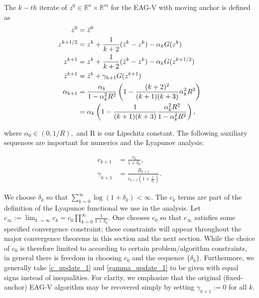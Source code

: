 \documentclass[11pt,reqno,oneside]{amsart}
\theoremstyle{definition}
\numberwithin{equation}{section}
\begin{document}
The $k-th$ iterate of $z^{0} \in \mathbb{R}^{n} \times \mathbb{R}^{m}$ for the EAG-V with moving anchor is defined as 
\begin{align}
    \notag z^{0}       &= \bar{z}^{0}\\
    \label{eagv update1} z^{k+1/2}   &= z^{k} + \frac{1}{k+2}(\bar{z}^{k} - z^{k}) - \alpha_{k}G(z^{k})\\
    \label{eagv update2} z^{k+1}     &= z^{k} + \frac{1}{k+2}(\bar{z}^{k} - z^{k}) - \alpha_{k}G(z^{k + 1/2})\\
    \label{eagv update3} \bar{z}^{k+1}&= \bar{z}^{k} + \gamma_{k+1}G(z^{k+1})\\
    \notag \alpha_{k+1}&= \frac{\alpha_{k}}{1 - \alpha_{k}^{2}R^{2}}\left(1 - \frac{(k+2)^{2}}{(k+1)(k+3)}\alpha_{k}^{2}R^{2}\right)\\
    &= \alpha_{k}\left(1 - \frac{1}{(k+1)(k+3)}\frac{\alpha_{k}^{2}R^{2}}{1 - \alpha_{k}^{2}R^{2}}\right), \label{normal_alpha}
\end{align}

where $\alpha_{0} \in (0,1/R),$ and R is our Lipschitz constant. The following auxiliary sequences are important for numerics and the Lyapunov analysis:

\begin{align}
    \label{c_update_1} c_{k+1}     &= \frac{c_{k}}{1 + \delta_{k}},\\
    \label{gamma_update_1} \gamma_{k+1}&= \frac{B_{k+1}}{c_{k+1}(1 + \frac{1}{\delta_{k}})}.
\end{align}

We choose $\delta_{k}$ so that $\displaystyle \sum_{k=0}^{\infty} \log(1 + \delta_{k}) < \infty$. 
The $c_{k}$ terms are part of the definition of the Lyapunov functional we use in the analysis.
Let $c_{\infty}:= \lim_{k \to \infty} c_{k} = c_{0} \prod_{k=0}^{\infty} \frac{1}{1+\delta_{k}}$. 
One chooses $c_{0}$ so that $c_{\infty}$ satisfies some specified convergence constraint; these constraints will appear throughout the major convergence theorems in this section and the next section.
While the choice of $c_{0}$ is therefore limited to according to certain problem/algorithm constraints, in general there is freedom in choosing $c_{0}$ and the sequence $\{\delta_{k}\}.$
Furthermore, we generally take \eqref{c_update_1} and \eqref{gamma_update_1} to be given with equal signs instead of inequalities. 
For clarity, we emphasize that the original (fixed-anchor) EAG-V algorithm may be recovered simply by setting $\gamma_{k+1} := 0$ for all $k.$
\end{document}
